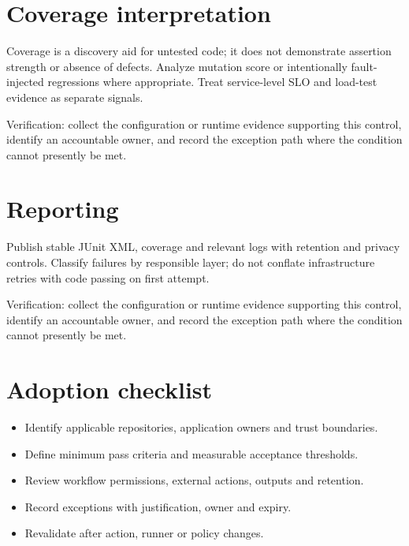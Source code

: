 \documentclass[11pt,letterpaper]{article}
\begin{document}
\section{Coverage interpretation}
Coverage is a discovery aid for untested code; it does not demonstrate assertion strength or absence of defects. Analyze mutation score or intentionally fault-injected regressions where appropriate. Treat service-level SLO and load-test evidence as separate signals.

Verification: collect the configuration or runtime evidence supporting this control, identify an accountable owner, and record the exception path where the condition cannot presently be met.

\section{Reporting}
Publish stable JUnit XML, coverage and relevant logs with retention and privacy controls. Classify failures by responsible layer; do not conflate infrastructure retries with code passing on first attempt.

Verification: collect the configuration or runtime evidence supporting this control, identify an accountable owner, and record the exception path where the condition cannot presently be met.

\section{Adoption checklist}
\begin{itemize}
\item Identify applicable repositories, application owners and trust boundaries.
\item Define minimum pass criteria and measurable acceptance thresholds.
\item Review workflow permissions, external actions, outputs and retention.
\item Record exceptions with justification, owner and expiry.
\item Revalidate after action, runner or policy changes.
\end{itemize}
\end{document}
